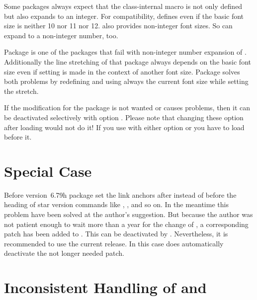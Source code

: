 Some packages always expect that the class-internal macro
 is not only defined but also expands to an
integer. For compatibility, \KOMAScript{} defines  even if the
basic font size is neither 10 nor 11 nor
12. \KOMAScript{} also provides non-integer font sizes. So
 can expand to a non-integer number, too.

Package  is one of the
packages that fail with non-integer number expansion of
. Additionally the line stretching of that package always
depends on the basic font size even if setting is made in the context of
another font size. Package  solves both problems by
redefining  and  using always the
current font size while setting the stretch.

If the modification for the package is not wanted or causes problems,
then it can be deactivated selectively with option
.
Please note that changing these option after loading
 would not do it! If you use  with
either option  or  you have to
load  before it.


\section{Special Case }

Before version~6.79h package  set the link anchors after
instead of before the heading of star version commands like
, , and so on. In
the meantime this problem have been solved at the \KOMAScript{} author's
suggestion. But because the \KOMAScript{} author was not patient enough to
wait more than a year for the change of , a corresponding
patch has been added to . This can be deactivated by
. Nevertheless, it is recommended to use the
current  release. In this case  does
automatically deactivate the not longer needed patch.%


\section{Inconsistent Handling of  and }

